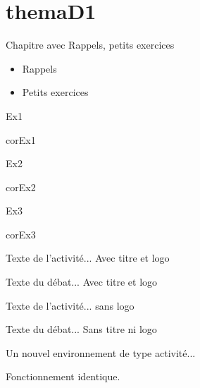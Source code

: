 \documentclass[nocrop]{sesamanuel}
\begin{document}
\chapter{themaD1}
\begin{prerequis}[Prérequis - D1]
  Chapitre avec Rappels, petits exercices
  \begin{itemize}
  \item Rappels
  \item Petits exercices
  \end{itemize}
\end{prerequis}

\begin{autoeval}
  \begin{multicols}{2}
    \begin{exercice}
      Ex1
    \end{exercice}
    \begin{corrige}
      corEx1
    \end{corrige}
    \begin{exercice}
      Ex2
    \end{exercice}
    \begin{corrige}
      corEx2
    \end{corrige}
\vfill \columnbreak
    \begin{exercice}
      Ex3
    \end{exercice}
    \begin{corrige}
      corEx3
    \end{corrige}
  \end{multicols}
\end{autoeval}


  \activites
  \begin{activite}
  Texte de l’activité... Avec titre et logo
  \end{activite}
  \begin{debat}
  Texte du débat... Avec titre et logo
  \end{debat}
  \begin{activite}
  Texte de l’activité... sans logo
  \end{activite}
  \begin{debat}
  Texte du débat... Sans titre ni logo
  \end{debat}
  \begin{nouveau}[titre][\tice]
  Un nouvel environnement de type activité...

  Fonctionnement identique.
  \end{nouveau}
\end{document}
